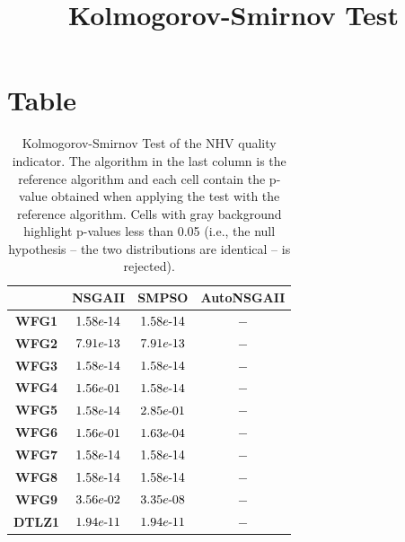 \documentclass{article}
\title{Kolmogorov-Smirnov Test}
\author{}
\begin{document}
\maketitle
\section{Table}
\begin{table}[!htp]
  \caption{Kolmogorov-Smirnov Test of the NHV quality indicator. The algorithm in the last column is the reference algorithm and each cell contain the p-value obtained when applying the test with the reference algorithm. Cells with gray background highlight p-values less than 0.05 (i.e., the null hypothesis -- the two distributions are identical -- is rejected).}
  \label{table:NHV}
  \centering
  \begin{tiny}
  \begin{tabular}{c|ccc}
      & \textbf{NSGAII} & \textbf{SMPSO} & \textbf{AutoNSGAII} \\\hline
\textbf{WFG1} & $\cellcolor{gray25} 1.58e\makebox[0.1cm]{-}14 $ & $ \cellcolor{gray25} 1.58e\makebox[0.1cm]{-}14 $ & $ -$ \\
\textbf{WFG2} & $\cellcolor{gray25} 7.91e\makebox[0.1cm]{-}13 $ & $ \cellcolor{gray25} 7.91e\makebox[0.1cm]{-}13 $ & $ -$ \\
\textbf{WFG3} & $\cellcolor{gray25} 1.58e\makebox[0.1cm]{-}14 $ & $ \cellcolor{gray25} 1.58e\makebox[0.1cm]{-}14 $ & $ -$ \\
\textbf{WFG4} & $1.56e\makebox[0.1cm]{-}01 $ & $ \cellcolor{gray25} 1.58e\makebox[0.1cm]{-}14 $ & $ -$ \\
\textbf{WFG5} & $\cellcolor{gray25} 1.58e\makebox[0.1cm]{-}14 $ & $ 2.85e\makebox[0.1cm]{-}01 $ & $ -$ \\
\textbf{WFG6} & $1.56e\makebox[0.1cm]{-}01 $ & $ \cellcolor{gray25} 1.63e\makebox[0.1cm]{-}04 $ & $ -$ \\
\textbf{WFG7} & $\cellcolor{gray25} 1.58e\makebox[0.1cm]{-}14 $ & $ \cellcolor{gray25} 1.58e\makebox[0.1cm]{-}14 $ & $ -$ \\
\textbf{WFG8} & $\cellcolor{gray25} 1.58e\makebox[0.1cm]{-}14 $ & $ \cellcolor{gray25} 1.58e\makebox[0.1cm]{-}14 $ & $ -$ \\
\textbf{WFG9} & $\cellcolor{gray25} 3.56e\makebox[0.1cm]{-}02 $ & $ \cellcolor{gray25} 3.35e\makebox[0.1cm]{-}08 $ & $ -$ \\
\textbf{DTLZ1} & $\cellcolor{gray25} 1.94e\makebox[0.1cm]{-}11 $ & $ \cellcolor{gray25} 1.94e\makebox[0.1cm]{-}11 $ & $ -$ \\

\end{tabular}
\end{tiny}
\end{table}
\end{document}
